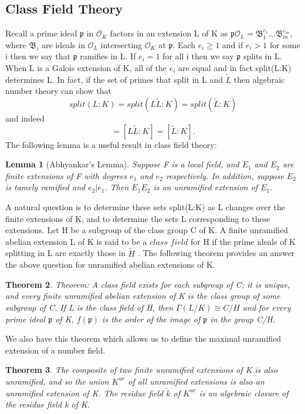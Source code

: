 \documentclass[preprint,12pt,reqno]{elsarticle}
\newtheorem{theorem}{Theorem}
\newtheorem{lemma}[theorem]{Lemma}
\begin{document}
\subsection{Class Field Theory}

Recall a prime ideal $\mathfrak{p}$ in $\mathcal{O}_K$ factors in an extension L of K as
\newline
$\mathfrak{p}\mathcal{O}_L=\mathfrak{B}_1^{e_1}...\mathfrak{B}_m^{e_m}$, where $\mathfrak{B}_i$ are ideals in $\mathcal{O}_L$ intersecting $\mathcal{O}_K$ at $\mathfrak{p}$. Each $e_i\geq1$ and if $e_i>1$ for some i then we say that $\mathfrak{p}$ ramifies in L. If $e_i=1$ for all i then we say $\mathfrak{p}$ splits in L.
\newline
When L is a Galois extension of K, all of the $e_i$ are equal and in fact split(L:K) determines L.
\newline
In fact, if the set of primes that split in L and $\tilde{L}$ then algebraic number theory can show that
\begin{equation}
 split(L:K)=split(L\tilde{L}:K)=split(\tilde{L}:K)
\end{equation}
 and indeed 
 \begin{equation}
 [L:K]=[L\tilde{L}:K]=[\tilde{L}:K].
 \end{equation}
 The following lemma is a useful result in class field theory:
 \begin{lemma}[Abhyankar's Lemma]
    Suppose F is a local field, and $E_1$ and $E_2$ are finite extensions of F with degrees $e_1$ and $e_2$ respectively. In addition, suppose $E_2$ is tamely ramified and $e_2|e_1$. Then $E_1E_2$ is an unramified extension of $E_1$.
 \end{lemma}
A natural question is to determine these sets split(L:K) as L changes over the finite extensions of K, and to determine the sets L corresponding to these extensions.
\newline
Let H be a subgroup of the class group C of K. A finite unramified abelian extension L of K is said to be a $\textit{class field}$ for H if the prime ideals of K splitting in L are exactly those in $\tilde{H}$ . The following theorem provides an answer the above question for unramified abelian extensions of K.
\begin{theorem}
Theorem: A class field exists for each subgroup of C; it is unique, and every finite unramified abelian extension of K is the class group of some subgroup of C. If L is the class field of H, then $\Gamma(L/K)\cong C/H$ and for every prime ideal $\mathfrak{p}$ of K, $f(\mathfrak{p})$ is the order of the image of $\mathfrak{p}$ in the group C/H.
\end{theorem}
We also have this theorem which allows us to define the maximal unramified extension of a number field. 
\begin{theorem}
The composite of two finite unramified extensions of K is also unramified, and so the union $K^{ur}$ of all unramified extensions is also an unramified extension of K. The residue field $\tilde{k}$ of $K^{ur}$ is an algebraic closure of the residue field k of K.
\end{theorem}
\end{document}
